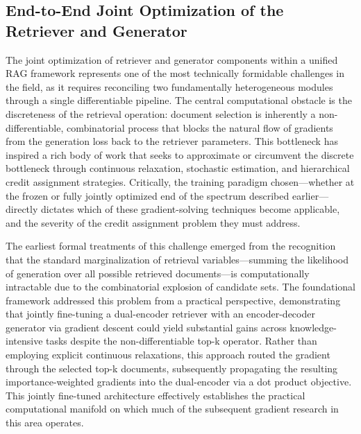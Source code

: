 \documentclass[11pt,a4paper]{article}
\begin{document}
\subsection{End-to-End Joint Optimization of the Retriever and Generator}


The joint optimization of retriever and generator components within a unified RAG framework represents one of the most technically formidable challenges in the field, as it requires reconciling two fundamentally heterogeneous modules through a single differentiable pipeline. The central computational obstacle is the discreteness of the retrieval operation: document selection is inherently a non-differentiable, combinatorial process that blocks the natural flow of gradients from the generation loss back to the retriever parameters. This bottleneck has inspired a rich body of work that seeks to approximate or circumvent the discrete bottleneck through continuous relaxation, stochastic estimation, and hierarchical credit assignment strategies. Critically, the training paradigm chosen---whether at the frozen or fully jointly optimized end of the spectrum described earlier---directly dictates which of these gradient-solving techniques become applicable, and the severity of the credit assignment problem they must address.

The earliest formal treatments of this challenge emerged from the recognition that the standard marginalization of retrieval variables---summing the likelihood of generation over all possible retrieved documents---is computationally intractable due to the combinatorial explosion of candidate sets. The foundational framework \cite{arxiv:2005.11401v4} addressed this problem from a practical perspective, demonstrating that jointly fine-tuning a dual-encoder retriever with an encoder-decoder generator via gradient descent could yield substantial gains across knowledge-intensive tasks despite the non-differentiable top-k operator. Rather than employing explicit continuous relaxations, this approach routed the gradient through the selected top-k documents, subsequently propagating the resulting importance-weighted gradients into the dual-encoder via a dot product objective. This jointly fine-tuned architecture effectively establishes the practical computational manifold on which much of the subsequent gradient research in this area operates.
\end{document}
